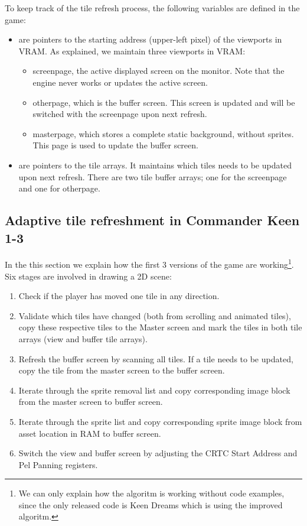 \documentclass[book.tex]{subfiles}
\begin{document}
To keep track of the tile refresh process, the following variables are defined in the game:
\begin{itemize}
  \item {} are pointers to the starting address (upper-left pixel) of the viewports in VRAM. As explained, we maintain three viewports in VRAM:
  \begin{itemize}
    \item screenpage, the active displayed screen on the monitor. Note that the engine never works or updates the active screen.
    \item otherpage, which is the buffer screen. This screen is updated and will be switched with the screenpage upon next refresh.
    \item masterpage, which stores a complete static background, without sprites. This page is used to update the buffer screen.
  \end{itemize}
  \item {} are pointers to the tile arrays. It maintains which tiles needs to be updated upon next refresh. There are two tile buffer arrays; one for the screenpage and one for otherpage. 
\end{itemize}

\subsection{Adaptive tile refreshment in Commander Keen 1-3}
In the this section we explain how the first 3 versions of the game are working\footnote{We can only explain how the algoritm is working without code examples, since the only released code is Keen Dreams which is using the improved algoritm.}. Six stages are involved in drawing a 2D scene:
\begin{enumerate}
\item Check if the player has moved one tile in any direction.
\item Validate which tiles have changed (both from scrolling and animated tiles), copy these respective tiles to the Master screen and mark the tiles in both tile arrays (view and buffer tile arrays).
\item Refresh the buffer screen by scanning all tiles. If a tile needs to be updated, copy the tile from the master screen to the buffer screen.
\item Iterate through the sprite removal list and copy corresponding image block from the master screen to buffer screen. 
\item Iterate through the sprite list and copy corresponding sprite image block from asset location in RAM to buffer screen.
\item Switch the view and buffer screen by adjusting the CRTC Start Address and Pel Panning registers.
\end{enumerate}
\end{document}
